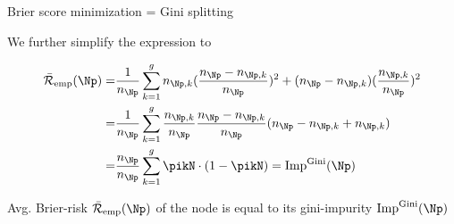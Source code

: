 \documentclass[11pt,compress,t,notes=noshow, xcolor=table]{beamer}
\begin{document}
\begin{framev}[fs=small]{Brier score minimization = Gini splitting}

We further simplify the expression to

\begin{align*}
\riskeb(\Np) =&  \frac{1}{n_\Np} \sum_{k = 1}^g n_{\Np,k}(\frac{n_{\Np } - n_{\Np,k}}{n_{\Np }})^2 + (n_{\Np } - n_{\Np,k})(\frac{n_{\Np,k}}{n_{\Np }})^2 \\
=& \frac{1}{n_\Np} \sum_{k = 1}^g \frac{n_{\Np,k}}{n_{\Np }} \frac{n_{\Np } - n_{\Np,k}}{n_{\Np }} (n_{\Np } - n_{\Np,k } + n_{\Np,k}) \\
=& \frac{n_{\Np }}{n_\Np} \sum_{k = 1}^g \pikN \cdot (1 - \pikN ) = \text{Imp}^{\text{Gini}}(\Np)
\end{align*} 

Avg. Brier-risk $\riskeb(\Np)$ of the node is equal to its gini-impurity $\text{Imp}^{\text{Gini}}(\Np)$

\end{framev}
\end{document}
